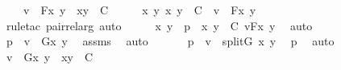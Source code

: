 \begin{isabellebody}
\ \ \ \ {\isachardoublequoteopen}v\ {\isasymin}\ {\isacharbraceleft}{\kern0pt}F{\isacharparenleft}{\kern0pt}x{\isacharcomma}{\kern0pt}\ y{\isacharparenright}{\kern0pt}\ {\isachardot}{\kern0pt}\ {\isasymlangle}x{\isacharcomma}{\kern0pt}y{\isasymrangle}\ {\isasymin}\ C{\isacharbraceright}{\kern0pt}{\isachardoublequoteclose}\isanewline
\ \ \isamarkupfalse%
\ \isamarkupfalse%
\ {\isachardoublequoteopen}{\isasymexists}x\ y{\isachardot}{\kern0pt}\ {\isasymlangle}x{\isacharcomma}{\kern0pt}\ y{\isasymrangle}\ {\isasymin}\ C\ {\isasymand}\ v\ {\isacharequal}{\kern0pt}\ F{\isacharparenleft}{\kern0pt}x{\isacharcomma}{\kern0pt}\ y{\isacharparenright}{\kern0pt}{\isachardoublequoteclose}\ \isanewline
\ \ \ \ \isamarkupfalse%
\ {\isacharparenleft}{\kern0pt}rule{\isacharunderscore}{\kern0pt}tac\ pair{\isacharunderscore}{\kern0pt}rel{\isacharunderscore}{\kern0pt}arg{\isacharsemicolon}{\kern0pt}\ auto{\isacharparenright}{\kern0pt}\isanewline
\ \ \isamarkupfalse%
\ \isamarkupfalse%
\ x\ y\ \ p{}\ {\isacharcolon}{\kern0pt}\ {\isachardoublequoteopen}{\isacharless}{\kern0pt}x{\isacharcomma}{\kern0pt}\ y{\isachargreater}{\kern0pt}\ {\isasymin}\ C{\isachardoublequoteclose}\ {\isachardoublequoteopen}v{\isacharequal}{\kern0pt}F{\isacharparenleft}{\kern0pt}x{\isacharcomma}{\kern0pt}\ y{\isacharparenright}{\kern0pt}{\isachardoublequoteclose}\ \isamarkupfalse%
\ auto\isanewline
\ \ \isamarkupfalse%
\ \isamarkupfalse%
\ p{}\ {\isacharcolon}{\kern0pt}\ {\isachardoublequoteopen}v\ {\isacharequal}{\kern0pt}\ G{\isacharparenleft}{\kern0pt}x{\isacharcomma}{\kern0pt}\ y{\isacharparenright}{\kern0pt}{\isachardoublequoteclose}\ \isamarkupfalse%
\ assms\ \isamarkupfalse%
\ auto\ \isanewline
\ \ \isamarkupfalse%
\ \isamarkupfalse%
\ p{}\ {\isacharcolon}{\kern0pt}\ {\isachardoublequoteopen}v\ {\isacharequal}{\kern0pt}\ split{\isacharparenleft}{\kern0pt}G{\isacharcomma}{\kern0pt}\ {\isacharless}{\kern0pt}x{\isacharcomma}{\kern0pt}\ y{\isachargreater}{\kern0pt}{\isacharparenright}{\kern0pt}{\isachardoublequoteclose}\ \isamarkupfalse%
\ p{}\ \isamarkupfalse%
\ auto\ \isanewline
\ \ \isamarkupfalse%
\ \isamarkupfalse%
\ {\isachardoublequoteopen}v\ {\isasymin}\ {\isacharbraceleft}{\kern0pt}G{\isacharparenleft}{\kern0pt}x{\isacharcomma}{\kern0pt}\ y{\isacharparenright}{\kern0pt}\ {\isachardot}{\kern0pt}\ {\isasymlangle}x{\isacharcomma}{\kern0pt}y{\isasymrangle}\ {\isasymin}\ C{\isacharbraceright}{\kern0pt}{\isachardoublequoteclose}\ \isanewline

\end{isabellebody}

